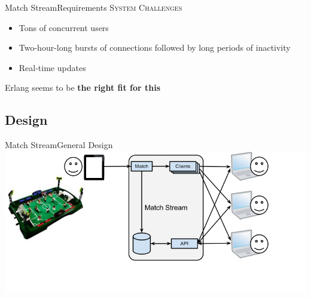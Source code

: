 \documentclass[utf8]{beamer}
\begin{document}
\begin{frame}{Match Stream}{Requirements}
	\textsc{System Challenges}
	\begin{itemize}
		\item<+-> Tons of concurrent users
		\item<+-> Two-hour-long bursts of connections followed by long periods of inactivity
		\item<+-> Real-time updates
	\end{itemize}
	\onslide<+->Erlang seems to be \textbf{the right fit for this}
\end{frame}

\subsection{Design}
\begin{frame}{Match Stream}{General Design}
	\includegraphics[width=\textwidth]{img/MatchStream.png}
\end{frame}
\end{document}
